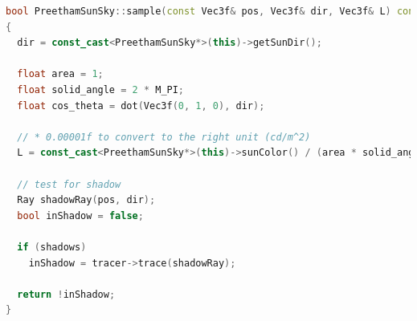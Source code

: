 \begin{lstlisting}[language=C++,caption=PreethamSunSky::sample(..),label=lst:preethamsunsky::sample,firstnumber=23]
bool PreethamSunSky::sample(const Vec3f& pos, Vec3f& dir, Vec3f& L) const
{
  dir = const_cast<PreethamSunSky*>(this)->getSunDir();

  float area = 1;
  float solid_angle = 2 * M_PI;
  float cos_theta = dot(Vec3f(0, 1, 0), dir);

  // * 0.00001f to convert to the right unit (cd/m^2)
  L = const_cast<PreethamSunSky*>(this)->sunColor() / (area * solid_angle * cos_theta) * 0.00001f;

  // test for shadow
  Ray shadowRay(pos, dir);
  bool inShadow = false;

  if (shadows)
    inShadow = tracer->trace(shadowRay);

  return !inShadow;
}
\end{lstlisting}